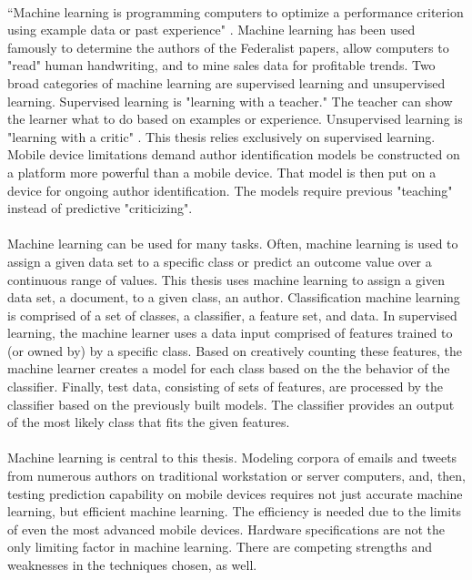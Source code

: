 	\paragraph{}``Machine learning is programming computers to optimize a performance criterion using example data or past experience" \cite{alpaydin_introduction_2004}.  Machine learning has been used famously to determine the authors of the Federalist papers, allow computers to "read" human handwriting, and to mine sales data for profitable trends.  Two broad categories of machine learning are supervised learning and unsupervised learning.  Supervised learning is "learning with a teacher."  The teacher can show the learner what to do based on examples or experience. Unsupervised learning is "learning with a critic" \cite{alpaydin_introduction_2004}. This thesis relies exclusively on supervised learning. Mobile device limitations demand author identification models be constructed on a platform more powerful than a mobile device.  That model is then put on a device for ongoing author identification.  The models require previous "teaching" instead of predictive "criticizing".

	\paragraph{}Machine learning can be used for many tasks.  Often, machine learning is used to assign a given data set to a specific class or predict an outcome value over a continuous range of values. This thesis uses machine learning to assign a given data set, a document, to a given class, an author. Classification machine learning is comprised of a set of classes, a classifier, a feature set, and data.  In supervised learning, the machine learner uses a data input comprised of features trained to (or owned by) by a specific class.  Based on creatively counting these features, the machine learner creates a model for each class based on the the behavior of the classifier.  Finally, test data, consisting of sets of features, are processed by the classifier based on the previously built models.  The classifier provides an output of the most likely class that fits the given features.

	\paragraph{}Machine learning is central to this thesis.  Modeling corpora of emails and tweets from numerous authors on traditional workstation or server computers, and, then, testing prediction capability on mobile devices requires not just accurate machine learning, but efficient machine learning.  The efficiency is needed due to the limits of even the most advanced mobile devices. Hardware specifications are not the only limiting factor in machine learning.  There are competing strengths and weaknesses in the techniques chosen, as well.

